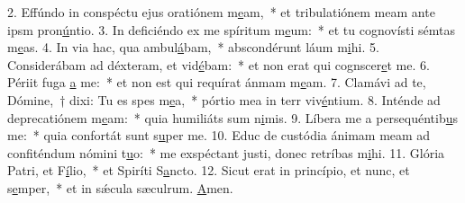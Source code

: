 2. Effúndo in conspéctu ejus oratiónem m\uline{e}am,~* et tribulatiónem meam ante ipsm pron\uline{ú}ntio.
3. In deficiéndo ex me spíritum m\uline{e}um:~* et tu cognovísti sémtas m\uline{e}as.
4. In via hac, qua ambul\uline{á}bam,~* abscondérunt láum m\uline{i}hi.
5. Considerábam ad déxteram, et vid\uline{é}bam:~* et non erat qui cognscer\uline{e}t me.
6. Périit fuga \uline{a} me:~* et non est qui requírat ánmam m\uline{e}am.
7. Clamávi ad te, Dómine,~† dixi: Tu es spes m\uline{e}a,~* pórtio mea in terr viv\uline{é}ntium.
8. Inténde ad deprecatiónem m\uline{e}am:~* quia humiliáts sum n\uline{i}mis.
9. Líbera me a persequéntib\uline{u}s me:~* quia confortát sunt s\uline{u}per me.
10. Educ de custódia ánimam meam ad confiténdum nómini t\uline{u}o:~* me exspéctant justi, donec retríbas m\uline{i}hi.
11. Glória Patri, et F\uline{í}lio,~* et Spiríti S\uline{a}ncto.
12. Sicut erat in princípio, et nunc, et s\uline{e}mper,~* et in sǽcula sæculrum. \uline{A}men.
